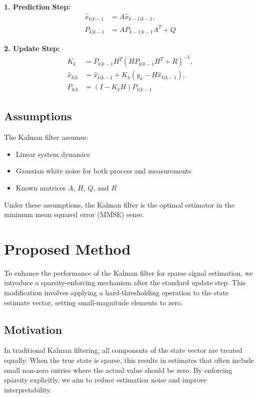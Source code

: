 \documentclass[12pt]{article}
\begin{document}
\textbf{1. Prediction Step:}
\begin{align}
    \hat{x}_{k|k-1} &= A \hat{x}_{k-1|k-1}, \\
    P_{k|k-1} &= A P_{k-1|k-1} A^T + Q
\end{align}

\textbf{2. Update Step:}
\begin{align}
    K_k &= P_{k|k-1} H^T (H P_{k|k-1} H^T + R)^{-1}, \\
    \hat{x}_{k|k} &= \hat{x}_{k|k-1} + K_k (y_k - H \hat{x}_{k|k-1}), \\
    P_{k|k} &= (I - K_k H) P_{k|k-1}
\end{align}

\subsection{Assumptions}
The Kalman filter assumes:
\begin{itemize}
    \item Linear system dynamics
    \item Gaussian white noise for both process and measurements
    \item Known matrices $A$, $H$, $Q$, and $R$
\end{itemize}

Under these assumptions, the Kalman filter is the optimal estimator in the minimum mean squared error (MMSE) sense.

\section{Proposed Method}

To enhance the performance of the Kalman filter for sparse signal estimation, we introduce a sparsity-enforcing mechanism after the standard update step. This modification involves applying a hard-thresholding operation to the state estimate vector, setting small-magnitude elements to zero.

\subsection{Motivation}
In traditional Kalman filtering, all components of the state vector are treated equally. When the true state is sparse, this results in estimates that often include small non-zero entries where the actual value should be zero. By enforcing sparsity explicitly, we aim to reduce estimation noise and improve interpretability.
\end{document}
